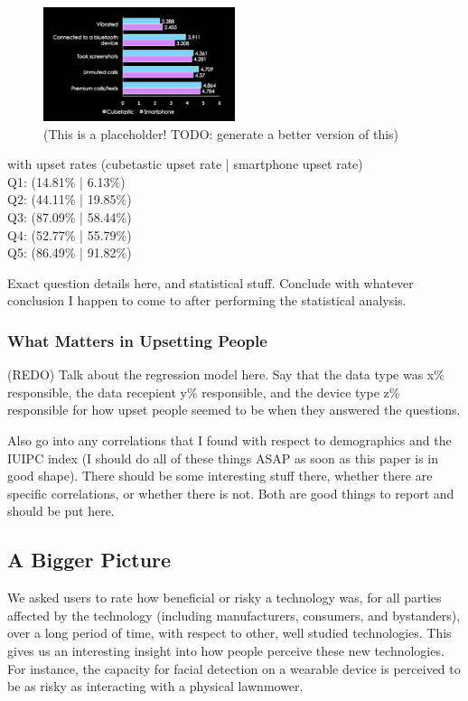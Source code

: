 \documentclass{acm_proc_article-sp}
\begin{document}
\begin{figure}
	\centering
	\includegraphics[width=0.5\textwidth]{device-type.png}
	\caption{(This is a placeholder! TODO: generate a better version of this)}
\end{figure}

with upset rates (cubetastic upset rate | smartphone upset rate)\\
Q1: (14.81\% | 6.13\%)\\
Q2: (44.11\% | 19.85\%)\\
Q3: (87.09\% | 58.44\%)\\
Q4: (52.77\% | 55.79\%)\\
Q5: (86.49\% | 91.82\%) 

Exact question details here, and statistical stuff. Conclude with whatever conclusion I happen to come to after performing the statistical analysis. 

\subsubsection{What Matters in Upsetting People}
(REDO) Talk about the regression model here. Say that the data type was x\% responsible, the data recepient y\% responsible, and the device type z\% responsible for how upset people seemed to be when they answered the questions. 

Also go into any correlations that I found with respect to demographics and the IUIPC index (I should do all of these things ASAP as soon as this paper is in good shape). There should be some interesting stuff there, whether there are specific correlations, or whether there is not. Both are good things to report and should be put here. 

\subsection{A Bigger Picture}

We asked users to rate how beneficial or risky a technology was, for all parties affected by the technology (including manufacturers, consumers, and bystanders), over a long period of time, with respect to other, well studied technologies. This gives us an interesting insight into how people perceive these new technologies. For instance, the capacity for facial detection on a wearable device is perceived to be as risky as interacting with a physical lawnmower. 
\end{document}
